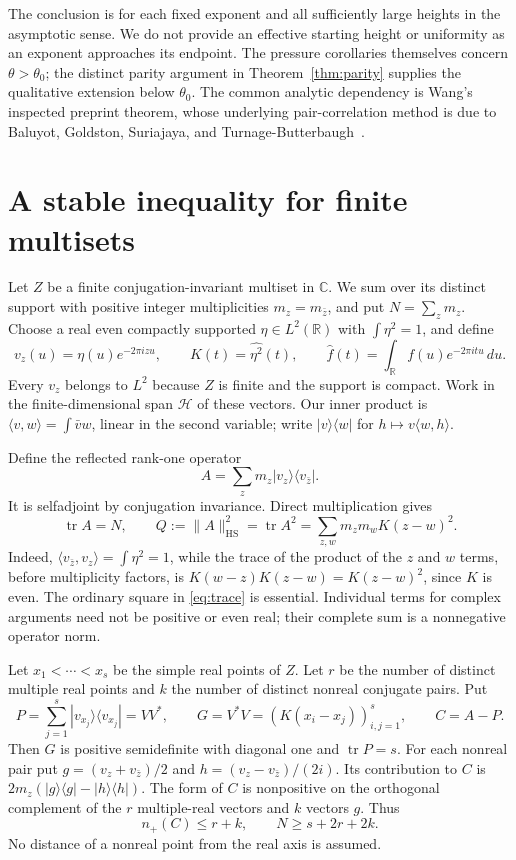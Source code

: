 \documentclass[11pt]{article}
\theoremstyle{remark}
\DeclareMathOperator{\tr}{tr}
\newcommand{\R}{\mathbb R}
\newcommand{\C}{\mathbb C}
\newcommand{\HS}{\mathrm{HS}}
\begin{document}
The conclusion is for each fixed exponent and all sufficiently large
heights in the asymptotic sense. We do not provide an effective starting
height or uniformity as an exponent approaches its endpoint. The pressure
corollaries themselves concern $\theta>\theta_0$; the distinct parity
argument in Theorem~\ref{thm:parity} supplies the qualitative extension
below $\theta_0$. The common analytic dependency
is Wang's inspected preprint theorem, whose underlying pair-correlation
method is due to Baluyot, Goldston, Suriajaya, and
Turnage-Butterbaugh~\cite{BGSTB,BGSTBcorrection}.

\section{A stable inequality for finite multisets}

Let $Z$ be a finite conjugation-invariant multiset in $\C$. We sum over its
distinct support with positive integer multiplicities $m_z=m_{\bar z}$,
and put $N=\sum_zm_z$. Choose a real even compactly supported
$\eta\in L^2(\R)$ with $\int\eta^2=1$, and define
\[
 v_z(u)=\eta(u)e^{-2\pi izu},\qquad
 K(t)=\widehat{\eta^2}(t),\qquad
 \widehat f(t)=\int_{\R}f(u)e^{-2\pi itu}\,du.
\]
Every $v_z$ belongs to $L^2$ because $Z$ is finite and the support is compact.
Work in the finite-dimensional span $\mathcal H$ of these vectors. Our inner product
is $\langle v,w\rangle=\int\bar v w$, linear in the second variable; write
$|v\rangle\langle w|$ for $h\mapsto v\langle w,h\rangle$.

Define the reflected rank-one operator
\begin{equation}\label{eq:operator}
 A=\sum_zm_z|v_z\rangle\langle v_{\bar z}|.
\end{equation}
It is selfadjoint by conjugation invariance. Direct multiplication gives
\begin{equation}\label{eq:trace}
 \tr A=N,\qquad
 Q:=\|A\|_{\HS}^2=\tr A^2
   =\sum_{z,w}m_zm_wK(z-w)^2.
\end{equation}
Indeed, $\langle v_{\bar z},v_z\rangle=\int\eta^2=1$, while the trace
of the product of the $z$ and $w$ terms, before multiplicity factors, is
$K(w-z)K(z-w)=K(z-w)^2$, since $K$ is even. The ordinary square in
\eqref{eq:trace} is essential. Individual terms for complex arguments need
not be positive or even real; their complete sum is a nonnegative operator
norm.

Let $x_1<\cdots<x_s$ be the simple real points of $Z$. Let $r$ be the
number of distinct multiple real points and $k$ the number of distinct
nonreal conjugate pairs. Put
\[
 P=\sum_{j=1}^s|v_{x_j}\rangle\langle v_{x_j}|=VV^*,\qquad
 G=V^*V=(K(x_i-x_j))_{i,j=1}^s,\qquad C=A-P.
\]
Then $G$ is positive semidefinite with diagonal one and $\tr P=s$.
For each nonreal pair put
$g=(v_z+v_{\bar z})/2$ and $h=(v_z-v_{\bar z})/(2i)$. Its contribution
to $C$ is $2m_z(|g\rangle\langle g|-|h\rangle\langle h|)$.
The form of $C$ is nonpositive on the orthogonal complement of the $r$
multiple-real vectors and $k$ vectors $g$. Thus
\begin{equation}\label{eq:inertia}
 n_+(C)\le r+k,\qquad N\ge s+2r+2k.
\end{equation}
No distance of a nonreal point from the real axis is assumed.
\end{document}
